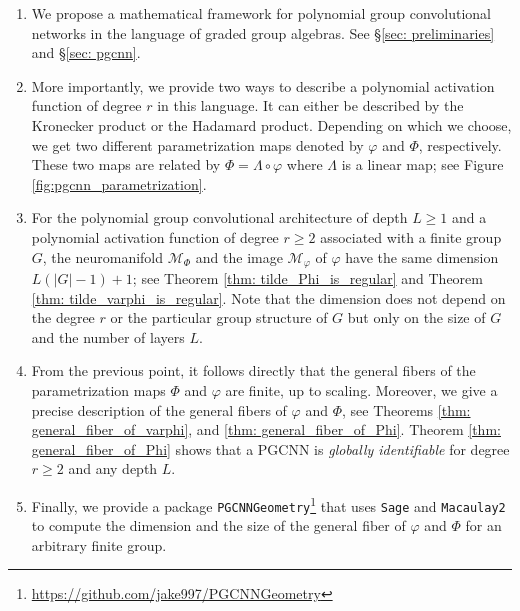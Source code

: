 \documentclass[final]{article}
\theoremstyle{definition}
\theoremstyle{plain}
\begin{document}
\begin{enumerate}
    \item  We propose a mathematical framework for polynomial group convolutional networks in the language of graded group algebras. See §\ref{sec: preliminaries} and §\ref{sec: pgcnn}.

    \item
    More importantly, we provide two ways to describe a polynomial activation function of degree $r$ in this language. 
    It can either be described by the Kronecker product or the Hadamard product.
    Depending on which we choose, we get two different parametrization maps denoted by $\varphi$ and $\Phi$, respectively.
    These two maps are related by $\Phi = \Lambda \circ \varphi$ where $\Lambda$ is a linear map; see Figure \ref{fig:pgcnn_parametrization}.



    \item For the polynomial group convolutional architecture of depth $L\geq 1$ and a polynomial activation function  of degree $r\geq 2$ associated with a finite group $G$, the neuromanifold $\mathcal{M}_\Phi$ and the image $\mathcal{M}_\varphi$ of $\varphi$ have the same dimension $L(|G|-1)+1$; see Theorem \ref{thm: tilde_Phi_is_regular} and Theorem \ref{thm: tilde_varphi_is_regular}.
    Note that the dimension does not depend on the degree $r$ or the particular group structure of $G$ but only on the size of $G$ and the number of layers $L$.

    \item From the previous point, it follows directly that the general fibers of the parametrization maps $\Phi$ and $\varphi$ are finite, up to scaling. Moreover, we give a precise description of the general fibers of $\varphi$ and $\Phi$, see Theorems \ref{thm: general_fiber_of_varphi}, and \ref{thm: general_fiber_of_Phi}.
    Theorem \ref{thm: general_fiber_of_Phi} shows that a PGCNN is \emph{globally identifiable} for degree $r\geq 2$ and any depth $L$.  

    \item Finally, we provide a package \texttt{PGCNNGeometry}\footnote{\url{https://github.com/jake997/PGCNNGeometry}} that uses \texttt{Sage} and \texttt{Macaulay2} to compute the dimension and the size of the general fiber of $\varphi$ and $\Phi$ for an arbitrary finite group.


    
\end{enumerate}
\end{document}
